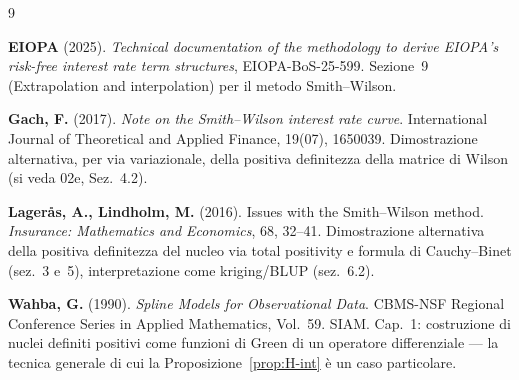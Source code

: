 \documentclass[11pt,a4paper]{article}
\theoremstyle{plain}
\theoremstyle{definition}
\theoremstyle{remark}
\begin{document}
\renewcommand{\refname}{Riferimenti bibliografici}
\begin{thebibliography}{9}

  \textbf{EIOPA} (2025).
  \textit{Technical documentation of the methodology to derive EIOPA's risk-free interest rate
  term structures}, EIOPA-BoS-25-599.
  Sezione~9 (Extrapolation and interpolation) per il metodo Smith--Wilson.

  \textbf{Gach, F.} (2017).
  \textit{Note on the Smith--Wilson interest rate curve}.
  International Journal of Theoretical and Applied Finance, 19(07), 1650039.
  Dimostrazione alternativa, per via variazionale, della positiva definitezza della matrice di
  Wilson (si veda 02e, Sez.~4.2).

  \textbf{Lager\aa s, A., Lindholm, M.} (2016).
  Issues with the Smith--Wilson method.
  \textit{Insurance: Mathematics and Economics}, 68, 32--41.
  Dimostrazione alternativa della positiva definitezza del nucleo via total positivity e
  formula di Cauchy--Binet (sez.~3 e~5), interpretazione come kriging/BLUP (sez.~6.2).

  \textbf{Wahba, G.} (1990).
  \textit{Spline Models for Observational Data}.
  CBMS-NSF Regional Conference Series in Applied Mathematics, Vol.~59. SIAM.
  Cap.~1: costruzione di nuclei definiti positivi come funzioni di Green di un operatore
  differenziale --- la tecnica generale di cui la Proposizione~\ref{prop:H-int} è un caso
  particolare.

\end{thebibliography}
\end{document}

